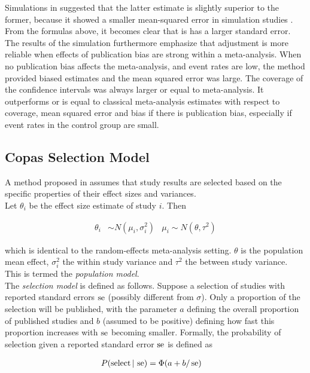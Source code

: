 \documentclass[11pt,a4paper,twoside]{book}\usepackage[]{graphicx}\usepackage[]{color}
\begin{document}
Simulations in \citet{limitmeta} suggested that the latter estimate is slightly superior to the former, because it showed a smaller mean-squared error in simulation studies \citet{limitmeta.2}. From the formulas above, it becomes clear that is has a larger standard error. The results of the simulation furthermore emphasize that adjustment is more reliable when effects of publication bias are strong within a meta-analysis. When no publication bias affects the meta-analysis, and event rates are low, the method provided biased estimates and the mean squared error was large. The coverage of the confidence intervals was always larger or equal to meta-analysis. It outperforms or is equal to classical meta-analysis estimates with respect to coverage, mean squared error and bias if there is publication bias, especially if event rates in the control group are small. 



\subsection{Copas Selection Model} \label{sec:copas}

A method proposed in \cite{Copas1,Copas2,Copas3} assumes that study results are selected based on the specific properties of their effect sizes and variances. \\
Let $\theta_i$ be the effect size estimate of study $i$. Then 

\begin{align}
\theta_i &\sim N(\mu_i, \sigma_i^2) &
\mu_i \sim N(\theta, \tau^2) \label{eq:population.model}
\end{align}

which is identical to the random-effects meta-analysis setting. $\theta$ is the population mean effect, $\sigma_i^2$ the within study variance and $\tau^2$ the between study variance. This is termed the \textit{population model}. \\
The \textit{selection model} is defined as follows. Suppose a selection of studies with reported %
standard errors $\operatorname{se}$ (possibly different from $\sigma$). Only a proportion of the selection will be published, with the parameter $a$ defining the overall proportion of published studies and $b$ (assumed to be positive) defining how fast this proportion increases with $\operatorname{se}$ becoming smaller. Formally, the probability of selection given a reported standard error $\operatorname{se}$ is defined as

\begin{align}
P(\textrm{select}\given \se) &= \Phi(a + b/\se) \nonumber %
\end{align}
\end{document}
